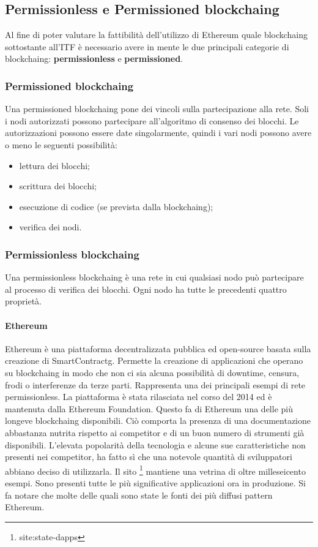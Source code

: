 \subsection{Permissionless e Permissioned \gls{blockchaing}}
Al fine di poter valutare la fattibilità dell’utilizzo di Ethereum quale \gls{blockchaing} sottostante all’ITF è necessario avere in mente le due principali categorie di \gls{blockchaing}: \textbf{permissionless} e \textbf{permissioned}.

\subsubsection{Permissioned \gls{blockchaing}}
Una permissioned \gls{blockchaing} pone dei vincoli sulla partecipazione alla rete. Soli i nodi autorizzati possono partecipare all’algoritmo di consenso dei blocchi. Le autorizzazioni possono essere date singolarmente, quindi i vari nodi possono avere o meno le seguenti possibilità:
\begin{itemize}
    \item lettura dei blocchi;
    \item scrittura dei blocchi;
    \item esecuzione di codice (se prevista dalla \gls{blockchaing});
    \item verifica dei nodi.
\end{itemize}

\subsubsection{Permissionless blockchaing}
Una permissionless \gls{blockchaing} è una rete in cui qualsiasi nodo può partecipare al processo di verifica dei blocchi. Ogni nodo ha tutte le precedenti quattro proprietà.

\paragraph{Ethereum}
Ethereum è una piattaforma decentralizzata pubblica ed open-source basata sulla creazione di \gls{SmartContractg}. Permette la creazione di applicazioni che operano su \gls{blockchaing} in modo che non ci sia alcuna possibilità di downtime, censura, frodi o interferenze da terze parti. Rappresenta una dei principali esempi di rete permissionless.
La piattaforma è stata rilasciata nel corso del 2014 ed è mantenuta dalla Ethereum Foundation. Questo fa di Ethereum una delle più longeve \gls{blockchaing} disponibili. Ciò comporta la presenza di una documentazione abbastanza nutrita rispetto ai competitor e di un buon numero di strumenti già disponibili. 
L’elevata popolarità della tecnologia e alcune sue caratteristiche non presenti nei competitor, ha fatto sì che una notevole quantità di sviluppatori abbiano deciso di utilizzarla. Il sito \footnote{site:state-dapps} mantiene una vetrina di oltre milleseicento esempi. Sono presenti tutte le più significative applicazioni ora in produzione. Si fa notare che molte delle quali sono state le fonti dei più diffusi pattern Ethereum.

